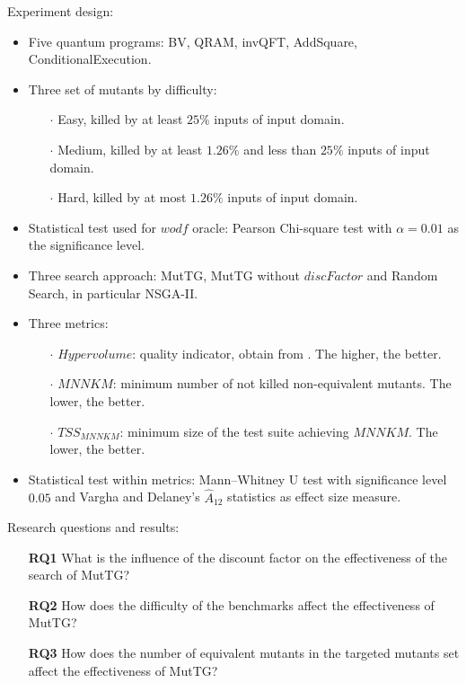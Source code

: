 \begin{itemize}
Experiment design:

\begin{itemize}
    \item Five quantum programs: BV, QRAM, invQFT, AddSquare, ConditionalExecution.
    \item Three set of mutants by difficulty: 
        \begin{itemize}
            \item[$\cdot$] Easy, killed by at least $25\%$ inputs of input domain.
            \item[$\cdot$] Medium, killed by at least $1.26\%$ and less than $25\%$ inputs of input domain.
            \item[$\cdot$] Hard, killed by at most $1.26\%$ inputs of input domain.
        \end{itemize}
    \item Statistical test used for $wodf$ oracle: Pearson Chi-square test with $\alpha= 0.01$ as the significance level.
    \item Three search approach: MutTG, MutTG without $discFactor$ and Random Search, in particular NSGA-II.
    \item Three metrics:
        \begin{itemize}
            \item[$\cdot$] $Hypervolume$: quality indicator, obtain from \cite{shang2020survey}. The higher, the better.
            \item[$\cdot$] $MNNKM$: minimum number of not killed non-equivalent mutants. The lower, the better.
            \item[$\cdot$] $TSS_{MNNKM}$: minimum size of the test suite achieving $MNNKM$. The lower, the better.
        \end{itemize}
    \item Statistical test within metrics: Mann–Whitney U test with significance level $0.05$ and Vargha and Delaney’s $\hat{A}_{12}$ statistics as effect size measure.
\end{itemize}

Research questions and results:

\begin{itemize}
    \item[] \textbf{RQ1} What is the influence of the discount factor on the effectiveness of the search of MutTG?
    \item[] \textbf{RQ2} How does the difficulty of the benchmarks affect  the effectiveness of MutTG?
    \item[] \textbf{RQ3} How does the number of equivalent mutants in the targeted mutants set affect the effectiveness of MutTG?
\end{itemize}


\end{itemize}

